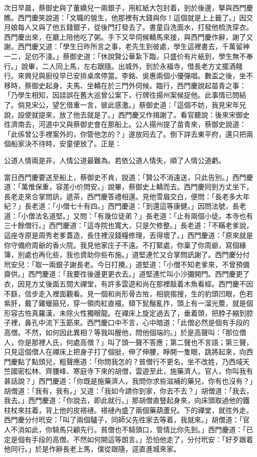 次日早晨，蔡御史與了董嬌兒一兩銀子，用紅紙大包封着，到於後邊，拏與西門慶瞧。西門慶笑說道：「文職的營生，他那裡有大錢與你！這個就是上上籤了。」因交月娘每人又與了他五錢銀子，從後門打發去了。書童舀洗面水，打發他梳洗穿衣。西門慶出來，在廳上陪他吃了粥。手下又早伺候轎馬來接，與西門慶作辭，謝了又謝。西門慶又道：「學生日昨所言之事，老先生到彼處，學生這裡書去，千萬留神一二，足仞不淺。」蔡御史道：「休說賢公華紮下臨，只盛价有片紙到，學生無不奉行。」說畢，二人同上馬，左右跟隨。出城外，到於永福寺，借長老方丈擺酒餞行。來興兒與廚役早已安排桌席停當。李銘、吳惠兩個小優彈唱。數盃之後，坐不移時，蔡御史起身，夫馬、坐轎在於三門外伺候。臨行，西門慶說起苗青之事：「乃學生相知，因詿誤在舊大巡曾公案下，行牌徃揚州案候捉他。此事情已問結了。倘見宋公，望乞借重一言，彼此感激。」蔡御史道：「這個不妨，我見宋年兄說，設使就提來，放了他去就是了。」西門慶又作揖謝了。看官聽說：後來宋御史徃濟南去，河道中又與蔡御史會在那船上。公人揚州提了苗青來，蔡御史說道：「此係曾公手裡案外的，你管他怎的？」遂放囘去了。倒下詳去東平府，還只把兩個船家決不待時，安童便放了。正是：

公道人情兩是非，人情公道最難為。若依公道人情失，順了人情公道虧。

當日西門慶要送至船上，蔡御史不肯，說道：「賢公不消遠送，只此告別。」西門慶道：「萬惟保重，容差小价問安。」說畢，蔡御史上轎而去。西門慶囘到方丈坐下，長老走來合掌問訊，遞茶，西門慶答禮相還。見他雪眉交白，便問：「長老多大年紀？」長老道：「小僧七十有四。」西門慶道：「到還這等康健。」因問法號，長老道：「小僧法名道堅。」又問：「有幾位徒弟？」長老道：「止有兩個小徒。本寺也有三十餘僧行。」西門慶道：「這寺院也寬大，只是欠修整。」長老道：「不瞞老爹說，這座寺原是周秀老爹蓋造，長住裡沒錢糧修理，丟得壞了。」西門慶道：「原來就是你守備府周爺的香火院。我見他家庄子不遠。不打緊處，你稟了你周爺，寫個緣簿，別處也再化些，我也資助你些布施。」道堅連忙又合掌問訊謝了。西門慶分付玳安兒：「取一兩銀子謝長老。今日打攪。」道堅道：「小僧不知老爹來，不曾預備齋供。」西門慶道：「我要徃後邊更更衣去。」道堅連忙叫小沙彌開門。西門慶更了衣，因見方丈後面五間大禪堂，有許多雲遊和尚在那裡敲着木魚看經。西門慶不因不繇，信步走入裡面觀看。見一個和尚形骨古恠，相貌搊搜，生的豹頭凹眼，色若紫肝，戴了雞蠟箍兒，穿一領肉紅直裰。頦下髭鬚亂拃，頭上有一溜光簷，就是個形容古恠真羅漢，未除火性獨眼龍。{}在禪床上旋定過去了，垂着頭，把脖子縮到腔子裡，鼻孔中流下玉筯來。西門慶口中不言，心中暗道：「此僧必然是個有手段的高僧。不然，如何因此異相？等我叫醒他，問他個端的。」於是高聲叫：「那位僧人，你是那裡人氏，何處高僧？」叫了頭一聲不答應；第二聲也不言語；第三聲，只見這個僧人在禪床上把身子打了個挺，伸了伸腰，睜開一隻眼，跳將起來，向西門慶點了點頭兒，{}粗聲應道：「你問我怎的？貧僧行不更名，坐不改姓，乃西域天竺國密松林、齊腰峰、寒庭寺下來的胡僧，雲遊至此，施藥濟人。官人，你叫我有甚話說？」西門慶道：「你既是施藥濟人，我問你求些滋補的藥兒，你有也沒有？」胡僧道：「我有，我有。」又道：「我如今請你到家，你去不去？」胡僧道：「我去，我去。」西門慶道：「你說去，即此就行。」那胡僧直豎起身來，向床頭取過他的鐵柱杖來拄着，背上他的皮褡褳。褡褳內盛了兩個藥葫蘆兒。下的禪堂，就徃外走。西門慶分付玳安：「叫了兩個驢子，同師父先徃家去等着，我就來。」胡僧道：「官人不消如此，你騎馬只顧先行。貧僧也不騎頭口，管情比你先到。」西門慶道：「已定是個有手段的高僧。不然如何開這等朗言。」恐怕他走了，分付玳安：「好歹跟着他同行。」於是作辭長老上馬，僕從跟隨，逕直進城來家。

